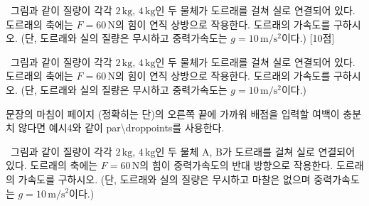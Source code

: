 \documentclass[]{gshs_exam_S}
\begin{document}
\begin{multicols*}{2}
\begin{questions}
\question[10] \ssh\ 그림과 같이 질량이 각각 $2\,\mathrm{kg}$, $4\,\mathrm{kg}$인 두 물체가 도르래를 걸쳐 실로 연결되어 있다. 도르래의 축에는 $F=60\,\mathrm{N}$의 힘이 연직 상방으로 작용한다. 도르래의 가속도를 구하시오. (단, 도르래와 실의 질량은 무시하고 중력가속도는 $g=10\,\mathrm{m/s^2}$이다.) [10점]
\end{questions}
\vspace{-1.4em}\noindent{}
\par\vspace{1em}\noindent{}\vspace{-1em}
\begin{questions}\extrawidth{8.1em}\setcounter{question}{0}
\question[10] \ssh\ 그림과 같이 질량이 각각 $2\,\mathrm{kg}$, $4\,\mathrm{kg}$인 두 물체가 도르래를 걸쳐 실로 연결되어 있다. 도르래의 축에는 $F=60\,\mathrm{N}$의 힘이 연직 상방으로 작용한다. 도르래의 가속도를 구하시오. (단, 도르래와 실의 질량은 무시하고 중력가속도는 $g=10\,\mathrm{m/s^2}$이다.) \droppoints
\end{questions}
\vspace{-1.4em}\noindent{}
문장의 마침이 페이지 (정확히는 단)의 오른쪽 끝에 가까워 배점을 입력할 여백이 충분치 않다면 예시4와 같이 {\ttfamily{\textbackslash}par{\textbackslash}droppoints}를 사용한다.
\par\vspace{1em}\noindent{}\vspace{-1em}
\begin{questions}\extrawidth{8.1em}\setcounter{question}{0}
\question[10] \ssh\ 그림과 같이 질량이 각각 $2\,\mathrm{kg}$, $4\,\mathrm{kg}$인 두 물체 A, B가 도르래를 걸쳐 실로 연결되어 있다. 도르래의 축에는 $F=60\,\mathrm{N}$의 힘이 중력가속도의 반대 방향으로 작용한다. 도르래의 가속도를 구하시오. (단, 도르래와 실의 질량은 무시하고 마찰은 없으며 중력가속도는 $g=10\,\mathrm{m/s^2}$이다.) \par\droppoints
\end{questions}
\vspace{-1.4em}\noindent{}

\vspace*{\fill}
\columnbreak


\end{multicols*}
\end{document}
